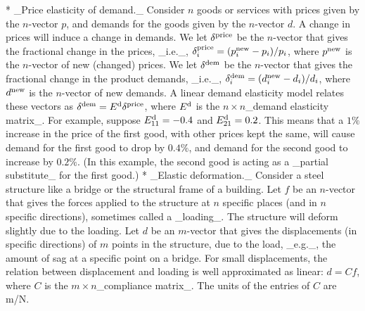 * _Price elasticity of demand._ Consider \(n\) goods or services with prices given by the \(n\)-vector \(p\), and demands for the goods given by the \(n\)-vector \(d\). A change in prices will induce a change in demands. We let \(\delta^{\rm price}\) be the \(n\)-vector that gives the fractional change in the prices, _i.e._, \(\delta^{\rm price}_{i}=(p^{\rm new}_{i}-p_{i})/p_{i}\), where \(p^{\rm new}\) is the \(n\)-vector of new (changed) prices. We let \(\delta^{\rm dem}\) be the \(n\)-vector that gives the fractional change in the product demands, _i.e._, \(\delta^{\rm dem}_{i}=(d^{\rm new}_{i}-d_{i})/d_{i}\), where \(d^{\rm new}\) is the \(n\)-vector of new demands. A linear demand elasticity model relates these vectors as \(\delta^{\rm dem}=E^{\rm d}\delta^{\rm price}\), where \(E^{\rm d}\) is the \(n\times n\)_demand elasticity matrix_. For example, suppose \(E^{\rm d}_{11}=-0.4\) and \(E^{\rm d}_{21}=0.2\). This means that a \(1\%\) increase in the price of the first good, with other prices kept the same, will cause demand for the first good to drop by \(0.4\%\), and demand for the second good to increase by \(0.2\%\). (In this example, the second good is acting as a _partial substitute_ for the first good.)
* _Elastic deformation._ Consider a steel structure like a bridge or the structural frame of a building. Let \(f\) be an \(n\)-vector that gives the forces applied to the structure at \(n\) specific places (and in \(n\) specific directions), sometimes called a _loading_. The structure will deform slightly due to the loading. Let \(d\) be an \(m\)-vector that gives the displacements (in specific directions) of \(m\) points in the structure, due to the load, _e.g._, the amount of sag at a specific point on a bridge. For small displacements, the relation between displacement and loading is well approximated as linear: \(d=Cf\), where \(C\) is the \(m\times n\)_compliance matrix_. The units of the entries of \(C\) are m/N.

 